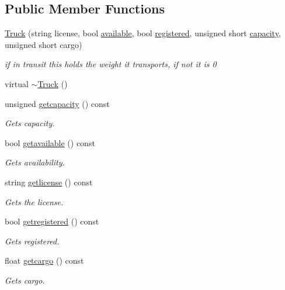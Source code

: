 \subsection*{Public Member Functions}
\begin{DoxyCompactItemize}
\item 
\hyperlink{class_truck_a310563b5c12feb94c1e1f8f855c1ee05}{Truck} (string license, bool \hyperlink{class_truck_a4189fe5ed32f6084459a9c5ae1eb7c2a}{available}, bool \hyperlink{class_truck_a80b8405cf7a15b236fef70116f99c4fb}{registered}, unsigned short \hyperlink{class_truck_ab004524786ae7aebf7c7bdb5e1599696}{capacity}, unsigned short cargo)
\begin{DoxyCompactList}\small\item\em if in transit this holds the weight it transports, if not it is 0 \end{DoxyCompactList}\item 
virtual \hyperlink{class_truck_afe887186d0490451a8ce4a3ef433dee3}{$\sim$\+Truck} ()
\item 
unsigned \hyperlink{class_truck_ab8c3a335924da7d2c36c4c5ba4510db0}{getcapacity} () const
\begin{DoxyCompactList}\small\item\em Gets capacity. \end{DoxyCompactList}\item 
bool \hyperlink{class_truck_a0eaa329bc72bf0171f7ec2a0a6240156}{getavailable} () const
\begin{DoxyCompactList}\small\item\em Gets availability. \end{DoxyCompactList}\item 
string \hyperlink{class_truck_ae76a7ae2343557680ae915c6c6d42ff8}{getlicense} () const
\begin{DoxyCompactList}\small\item\em Gets the license. \end{DoxyCompactList}\item 
bool \hyperlink{class_truck_a830838ed22465cf27f56b911c3fadf13}{getregistered} () const
\begin{DoxyCompactList}\small\item\em Gets registered. \end{DoxyCompactList}\item 
float \hyperlink{class_truck_a3936315853876f84c85c4ffff194e1a5}{getcargo} () const
\begin{DoxyCompactList}\small\item\em Gets cargo. \end{DoxyCompactList}\item 

\end{DoxyCompactItemize}
